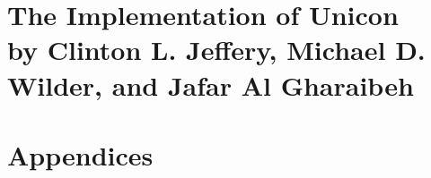 \documentclass[letterpaper,twoside,12pt]{book}
\begin{document}
















\part[The Implementation of Unicon]%
{The Implementation of Unicon\\
{\large by Clinton L. Jeffery, Michael D. Wilder, and Jafar Al Gharaibeh}}









\part{Appendices}
\appendix














\clearpage
\bigskip
\backmatter

\cleardoublepage

\printindex

\bigskip
\end{document}
